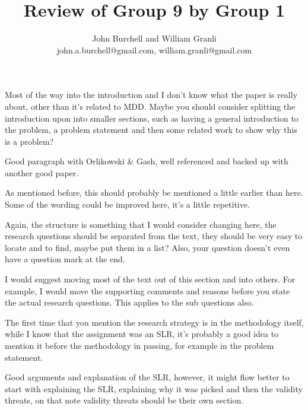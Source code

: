 \documentclass[times, 10pt,twocolumn]{article}
\begin{document}
\title{Review of Group 9 by Group 1}

\author{John Burchell and William Granli \\
john.a.burchell@gmail.com, william.granli@gmail.com}



\maketitle
\thispagestyle{empty}





Most of the way into the introduction and I don't know what the paper is really about, other than it's related to MDD. Maybe you should consider splitting the introduction upon into smaller sections, such as having a general introduction to the problem, a problem statement and then some related work to show why this is a problem?

Good paragraph with Orlikowski \& Gash, well referenced and backed up with another good paper.

As mentioned before, this should probably be mentioned a little earlier than here. Some of the wording could be improved here, it's a little repetitive. 

Again, the structure is something that I would consider changing here, the research questions should be separated from the text, they should be very easy to locate and to find, maybe put them in a list? Also, your question doesn't even have a question mark at the end.

I would suggest moving most of the text out of this section and into others. For example, I would move the supporting comments and reasons before you state the actual research questions. This applies to the sub questions also.



The first time that you mention the research strategy is in the methodology itself, while I know that the assignment was an SLR, it's probably a good idea to mention it before the methodology in passing, for example in the problem statement.

Good arguments and explanation of the SLR, however, it might flow better to start with explaining the SLR, explaining why it was picked and then the validity threats, on that note validity threats should be their own section.
\end{document}
